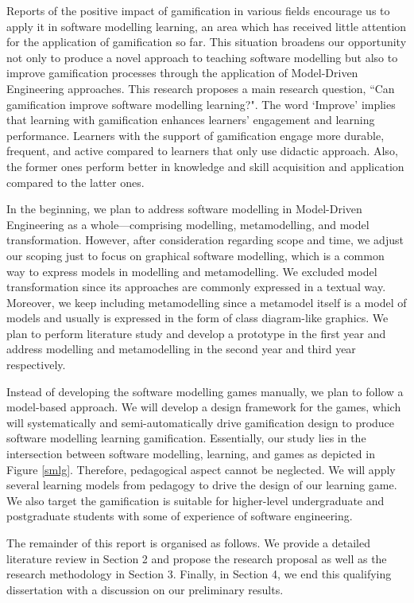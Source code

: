 \documentclass[12pt, a4paper]{report}
\begin{document}
Reports of the positive impact of gamification in various fields encourage us to apply it in software modelling learning, an area which has received little attention for the application of gamification so far. This situation broadens our opportunity not only to produce a novel approach to teaching software modelling but also to improve gamification processes through the application of Model-Driven Engineering approaches. This research proposes a main research question, ``Can gamification improve software modelling learning?". The word `Improve' implies that learning with gamification enhances learners' engagement and learning performance. Learners with the support of gamification engage more durable, frequent, and active compared to learners that only use didactic approach. Also, the former ones perform better in knowledge and skill acquisition and application compared to the latter ones.   

In the beginning, we plan to address software modelling in Model-Driven Engineering as a whole---comprising modelling, metamodelling, and model transformation. However, after consideration regarding scope and time, we adjust our scoping just to focus on graphical software modelling, which is a common way to express models in modelling and metamodelling. We excluded model transformation since its approaches are commonly expressed in a textual way. Moreover, we keep including metamodelling since a metamodel itself is a model of models and usually is expressed in the form of class diagram-like graphics. We plan to perform literature study and develop a prototype in the first year and address modelling and metamodelling in the second year and third year respectively. 
    
Instead of developing the software modelling games manually, we plan to follow a model-based approach. We will develop a design framework for the games, which will systematically and semi-automatically drive gamification design to produce software modelling learning gamification. Essentially, our study lies in the intersection between software modelling, learning, and games as depicted in Figure \ref{smlg}. Therefore, pedagogical aspect cannot be neglected. We will apply several learning models from pedagogy to drive the design of our learning game. We also target the gamification is suitable for higher-level undergraduate and postgraduate students with some of experience of software engineering. 

The remainder of this report is organised as follows. We provide a detailed literature review in Section 2 and propose the research proposal as well as the research methodology in Section 3. Finally, in Section 4, we end this qualifying dissertation with a discussion on our preliminary results. 
\end{document}
